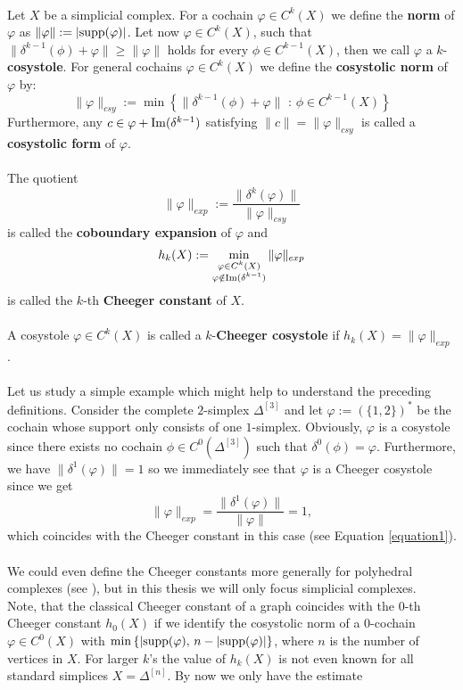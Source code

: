 \\
Let \(X\) be a simplicial complex. For a cochain \(\varphi\in C^k(X)\) we define the \textbf{norm} of \(\varphi\) as \(\|\varphi\|:=|\mathrm{supp}(\varphi)|\). Let now \(\varphi\in C^k(X)\), such that \(\|\delta^{k-1}(\phi)+\varphi\|\geq\|\varphi\|\) holds for every \(\phi\in C^{k-1}(X)\), then we call \(\varphi\) a \(k\)-\textbf{cosystole}. For general cochains \(\varphi\in C^k(X)\) we define the \textbf{cosystolic norm} of \(\varphi\) by:
\[
\|\varphi\|_{csy}:=\min\left\{\|\delta^{k-1}(\phi)+\varphi\|\text{ : }\phi\in C^{k-1}(X)\right\}
\]
Furthermore, any \(c\in \varphi+\mathrm{Im}(\delta^{k-1})\) satisfying \(\|c\|=\|\varphi\|_{csy}\) is called a \textbf{cosystolic form} of \(\varphi\).\\
\\
The quotient
\[
\|\varphi\|_{exp}:=\frac{\|\delta^k(\varphi)\|}{\|\varphi\|_{csy}}
\]
is called the \textbf{coboundary expansion} of \(\varphi\) and
\[
h_k(X):=\min_{\substack{\varphi\in C^k(X)\\\varphi\notin\mathrm{Im}(\delta^{k-1})}}\|\varphi\|_{exp}
\]
is called the \(k\)-th \textbf{Cheeger constant} of \(X\).\\
\\
A cosystole \(\varphi\in C^k(X)\) is called a \(k\)-\textbf{Cheeger cosystole} if \(h_k(X)=\|\varphi\|_{exp}\).\\
\\
Let us study a simple example which might help to understand the preceding definitions. Consider the complete \(2\)-simplex \(\Delta^{[3]}\) and let \(\varphi:=(\{1,2\})^*\) be the cochain whose support only consists of one \(1\)-simplex. Obviously, \(\varphi\) is a cosystole since there exists no cochain \(\phi\in C^0(\Delta^{[3]})\) such that \(\delta^0(\phi)=\varphi\). Furthermore, we have \(\|\delta^1(\varphi)\|=1\) so we immediately see that \(\varphi\) is a Cheeger cosystole since we get
\[
\|\varphi\|_{exp}=\frac{\|\delta^1(\varphi)\|}{\|\varphi\|}=1,
\]
which coincides with the Cheeger constant in this case (see Equation \ref{equation1}).\\
\\
We could even define the Cheeger constants more generally for polyhedral complexes (see \cite{6}), but in this thesis we will only focus simplicial complexes.\\
Note, that the classical Cheeger constant of a graph coincides with the \(0\)-th Cheeger constant \(h_0(X)\) if we identify the cosystolic norm of a \(0\)-cochain \(\varphi\in C^0(X)\) with \(\min\left\{|\mathrm{supp}(\varphi)\text{, }n-|\mathrm{supp}(\varphi)|\right\}\), where \(n\) is the number of vertices in \(X\). For larger \(k\)'s the value of \(h_k(X)\) is not even known for all standard simplices \(X=\Delta^{[n]}\). By now we only have the estimate

